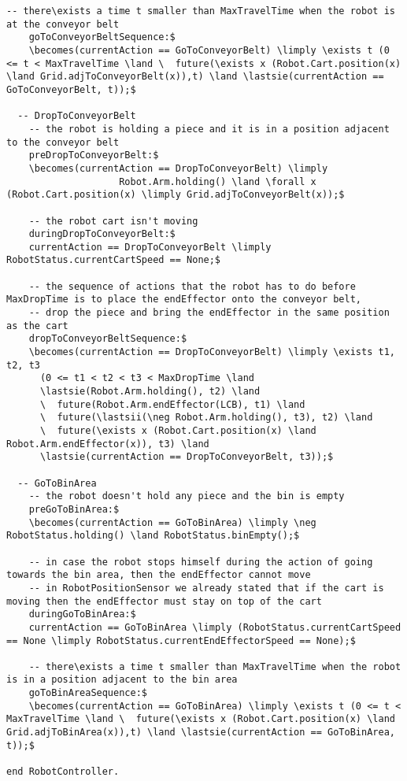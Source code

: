 \begin{lstlisting}[fontadjust, mathescape, frame=single]
    -- there\exists a time t smaller than MaxTravelTime when the robot is at the conveyor belt
    goToConveyorBeltSequence:$
    \becomes(currentAction == GoToConveyorBelt) \limply \exists t (0 <= t < MaxTravelTime \land \  future(\exists x (Robot.Cart.position(x) \land Grid.adjToConveyorBelt(x)),t) \land \lastsie(currentAction == GoToConveyorBelt, t));$
    
  -- DropToConveyorBelt
    -- the robot is holding a piece and it is in a position adjacent to the conveyor belt
    preDropToConveyorBelt:$
    \becomes(currentAction == DropToConveyorBelt) \limply
                    Robot.Arm.holding() \land \forall x (Robot.Cart.position(x) \limply Grid.adjToConveyorBelt(x));$
    
    -- the robot cart isn't moving
    duringDropToConveyorBelt:$
    currentAction == DropToConveyorBelt \limply RobotStatus.currentCartSpeed == None;$

    -- the sequence of actions that the robot has to do before MaxDropTime is to place the endEffector onto the conveyor belt,
    -- drop the piece and bring the endEffector in the same position as the cart
    dropToConveyorBeltSequence:$
    \becomes(currentAction == DropToConveyorBelt) \limply \exists t1, t2, t3
      (0 <= t1 < t2 < t3 < MaxDropTime \land
      \lastsie(Robot.Arm.holding(), t2) \land
      \  future(Robot.Arm.endEffector(LCB), t1) \land
      \  future(\lastsii(\neg Robot.Arm.holding(), t3), t2) \land
      \  future(\exists x (Robot.Cart.position(x) \land Robot.Arm.endEffector(x)), t3) \land
      \lastsie(currentAction == DropToConveyorBelt, t3));$

  -- GoToBinArea
    -- the robot doesn't hold any piece and the bin is empty
    preGoToBinArea:$
    \becomes(currentAction == GoToBinArea) \limply \neg RobotStatus.holding() \land RobotStatus.binEmpty();$
    
    -- in case the robot stops himself during the action of going towards the bin area, then the endEffector cannot move
    -- in RobotPositionSensor we already stated that if the cart is moving then the endEffector must stay on top of the cart
    duringGoToBinArea:$
    currentAction == GoToBinArea \limply (RobotStatus.currentCartSpeed == None \limply RobotStatus.currentEndEffectorSpeed == None);$

    -- there\exists a time t smaller than MaxTravelTime when the robot is in a position adjacent to the bin area
    goToBinAreaSequence:$
    \becomes(currentAction == GoToBinArea) \limply \exists t (0 <= t < MaxTravelTime \land \  future(\exists x (Robot.Cart.position(x) \land Grid.adjToBinArea(x)),t) \land \lastsie(currentAction == GoToBinArea, t));$
                    
end RobotController.
\end{lstlisting}